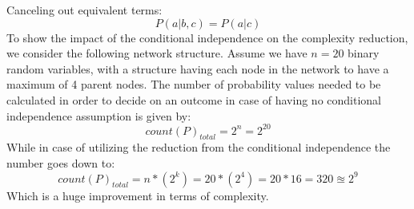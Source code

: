 \documentclass{article}
\begin{document}
Canceling out equivalent terms:
\begin{equation}
P(a|b,c) = P(a|c)
\end{equation}
To show the impact of the conditional independence on the complexity reduction, we consider the following network structure. Assume we have $n=20$ binary random variables, with a structure having each node in the network to have a maximum of 4 parent nodes. The number of probability values needed to be calculated in order to decide on an outcome in case of having no conditional independence assumption is given by:
\begin{equation}
count(P)_{total} = 2^{n} = 2^{20}
\end{equation}
While in case of utilizing the reduction from the conditional independence the number goes down to:
\begin{equation}
count(P)_{total} = n*(2^k) = 20*(2^4)= 20*16= 320 \approxeq 2^9
\end{equation}
Which is a huge improvement in terms of complexity.
\end{document}
